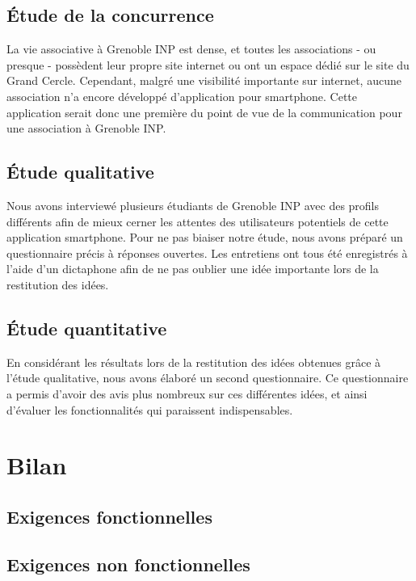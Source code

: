 \documentclass[a4paper, 11px]{article}
\begin{document}
\subsection{Étude de la concurrence}
La vie associative à Grenoble INP est dense, et toutes les associations - ou presque - possèdent leur propre site internet ou ont un espace dédié sur le site du Grand Cercle.
Cependant, malgré une visibilité importante sur internet, aucune association n'a encore développé d'application pour smartphone. Cette application serait donc une première du point de vue de la communication pour une association à Grenoble INP.

\subsection{Étude qualitative}
Nous avons interviewé plusieurs étudiants de Grenoble INP avec des profils différents afin de mieux cerner les attentes des utilisateurs potentiels de cette application smartphone. Pour ne pas biaiser notre étude, nous avons préparé un questionnaire précis à réponses ouvertes.
Les entretiens ont tous été enregistrés à l'aide d'un dictaphone afin de ne pas oublier une idée importante lors de la restitution des idées. 

\subsection{Étude quantitative}
En considérant les résultats lors de la restitution des idées obtenues grâce à l'étude qualitative, nous avons élaboré un second questionnaire. Ce questionnaire a permis d'avoir des avis plus nombreux sur ces différentes idées, et ainsi d'évaluer les fonctionnalités qui paraissent indispensables.

\newpage

\section{Bilan}

\subsection{Exigences fonctionnelles}


\subsection{Exigences non fonctionnelles}


\appendix
\addappheadtotoc
\end{document}
